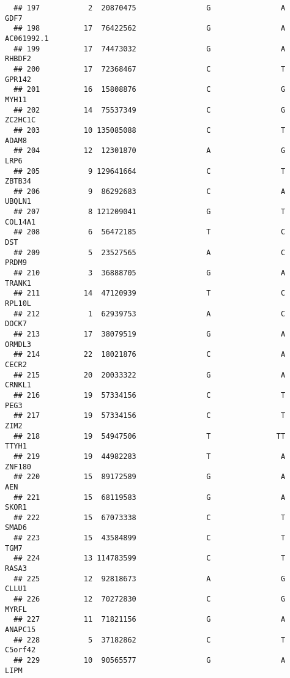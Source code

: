 \documentclass[12pt,twoside]{reedthesis}
\theoremstyle{definition}
\theoremstyle{definition}
\theoremstyle{remark}
\begin{document}
\begin{verbatim}
  ## 197           2  20870475                G                A           GDF7
  ## 198          17  76422562                G                A     AC061992.1
  ## 199          17  74473032                G                A         RHBDF2
  ## 200          17  72368467                C                T         GPR142
  ## 201          16  15808876                C                G          MYH11
  ## 202          14  75537349                C                G        ZC2HC1C
  ## 203          10 135085088                C                T          ADAM8
  ## 204          12  12301870                A                G           LRP6
  ## 205           9 129641664                C                T         ZBTB34
  ## 206           9  86292683                C                A         UBQLN1
  ## 207           8 121209041                G                T        COL14A1
  ## 208           6  56472185                T                C            DST
  ## 209           5  23527565                A                C          PRDM9
  ## 210           3  36888705                G                A         TRANK1
  ## 211          14  47120939                T                C         RPL10L
  ## 212           1  62939753                A                C          DOCK7
  ## 213          17  38079519                G                A         ORMDL3
  ## 214          22  18021876                C                A          CECR2
  ## 215          20  20033322                G                A         CRNKL1
  ## 216          19  57334156                C                T           PEG3
  ## 217          19  57334156                C                T           ZIM2
  ## 218          19  54947506                T               TT          TTYH1
  ## 219          19  44982283                T                A         ZNF180
  ## 220          15  89172589                G                A            AEN
  ## 221          15  68119583                G                A          SKOR1
  ## 222          15  67073338                C                T          SMAD6
  ## 223          15  43584899                C                T           TGM7
  ## 224          13 114783599                C                T          RASA3
  ## 225          12  92818673                A                G          CLLU1
  ## 226          12  70272830                C                G          MYRFL
  ## 227          11  71821156                G                A        ANAPC15
  ## 228           5  37182862                C                T        C5orf42
  ## 229          10  90565577                G                A           LIPM

\end{verbatim}
\end{document}
